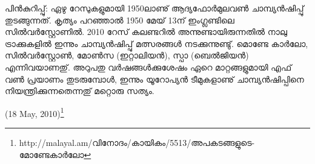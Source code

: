 പിന്‍കുറിപ്പു്: ഏഴു റേസുകളുമായി 1950ലാണു് ആദ്യഫോര്‍മുലവണ്‍ ചാമ്പ്യന്‍ഷിപ്പു് തുടങ്ങുന്നത്. കൃത്യം പറഞ്ഞാല്‍ 
1950 മേയ് 13ന് ഇംഗ്ലണ്ടിലെ സില്‍വര്‍സ്റ്റോണില്‍. 2010 റേസ് കലണ്ടറില്‍ അന്നുണ്ടായിരുന്നതില്‍ നാലു 
ട്രാക്കുകളില്‍ ഇന്നും ചാമ്പ്യന്‍ഷിപ്പു് മത്സരങ്ങള്‍ നടക്കുന്നുണ്ടു്. മൊണ്ടേ കാര്‍ലോ, സില്‍വര്‍സ്റ്റോണ്‍, മോണ്‍സ 
(ഇറ്റാലിയന്‍), സ്പാ (ബെല്‍ജിയന്‍) എന്നിവയാണതു്. അറുപതു വര്‍ഷങ്ങള്‍ക്കുശേഷം ഏറെ മാറ്റങ്ങളുമായി എഫ് 
വണ്‍ പ്രയാണം തുടരുമ്പോള്‍, ഇന്നും യൂറോപ്യന്‍ ടീമുകളാണു് ചാമ്പ്യന്‍ഷിപ്പിനെ നിയന്ത്രിക്കുന്നതെന്നതു് മറ്റൊരു 
സത്യം.

\begin{flushright}(18 May, 2010)\footnote{http://malayal.am/വിനോദം/കായികം/5513/അപകടങ്ങളുടെ-മോണ്ടേകാര്‍ലോ}\end{flushright}

\newpage
